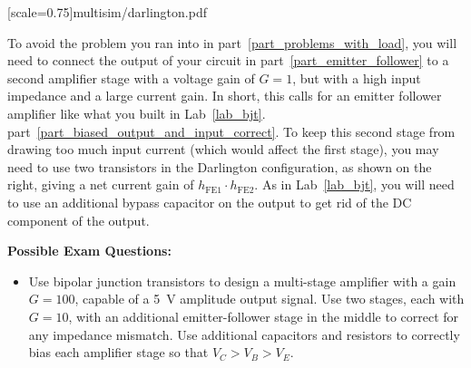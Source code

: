 \begin{enumerate}[wide]
[scale=0.75]{multisim/darlington.pdf}{%
\medskip

\item To avoid the problem you ran into in part~\ref{part_problems_with_load}, you will need to connect the output of your circuit in part~\ref{part_emitter_follower} to a second amplifier stage with a voltage gain of $G=1$, but with a high input impedance and a large current gain. In short, this calls for an emitter follower amplifier like what you built in Lab~\ref{lab_bjt}. part~\ref{part_biased_output_and_input_correct}.
To keep this second stage from drawing too much input current (which would affect the first stage), you may need to use two transistors in the Darlington configuration, as shown on the right, giving a net current gain of $h_\text{FE1} \cdot h_\text{FE2}$.  As in Lab~\ref{lab_bjt}, you will need to use an additional bypass capacitor on the output to get rid of the DC component of the output. \label{part_common_emitter_and_emitter_follower}
\vspace{0.2in}
}

\end{enumerate}

\pagebreak[3]
\textbf{Possible Exam Questions:}
\begin{itemize}
\item Use bipolar junction transistors to design a multi-stage amplifier with a gain $G=100$, capable of a 5~V amplitude output signal.  Use two stages, each with $G=10$, with an additional emitter-follower stage in the middle to correct for any impedance mismatch.  Use additional capacitors and resistors to correctly bias each amplifier stage so that $V_C > V_B > V_E$.

\end{itemize}




